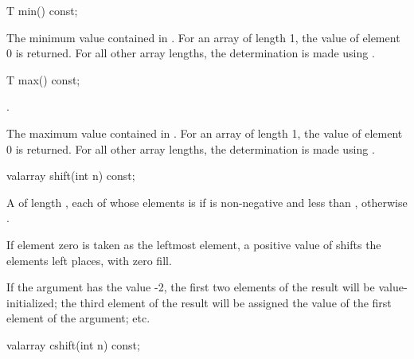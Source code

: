 %
\begin{itemdecl}
T min() const;
\end{itemdecl}

\begin{itemdescr}
\pnum
\requires
{}

\pnum
\returns
The minimum value contained in .
For an array of length 1, the value of element 0 is returned.
For all other array
lengths, the determination is made using
.
\end{itemdescr}

%
\begin{itemdecl}
T max() const;
\end{itemdecl}

\begin{itemdescr}
\pnum
\requires
{}.

\pnum
\returns
The maximum value contained in .
For an array of length 1, the value of element 0 is returned.
For all other array
lengths, the determination is made using
.
\end{itemdescr}

%
\begin{itemdecl}
valarray shift(int n) const;
\end{itemdecl}

\begin{itemdescr}
\pnum
\returns
A  of length , each of whose elements
 is
if 
is non-negative and less than
, otherwise .
\begin{note}
If element zero is taken as the leftmost element,
a positive value of  shifts the elements left 
places, with zero fill.
\end{note}

\pnum
\begin{example}
If the argument has the value -2,
the first two elements of the result will be value-initialized; the third element of the result will be assigned the value
of the first element of the argument; etc.
\end{example}
\end{itemdescr}

%
\begin{itemdecl}
valarray cshift(int n) const;
\end{itemdecl}

